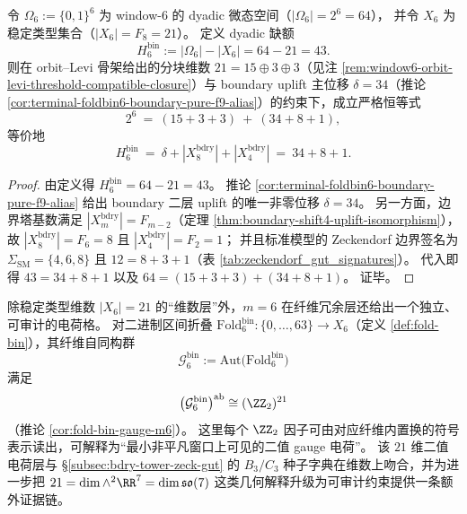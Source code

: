 \begin{proposition}\label{prop:window6-dyadic-budget-three-stage}
令 \(\Omega_6:=\{0,1\}^6\) 为 window-\(6\) 的 dyadic 微态空间（\(|\Omega_6|=2^6=64\)），
并令 \(X_6\) 为稳定类型集合（\(|X_6|=F_8=21\)）。
定义 dyadic 缺额
\[
H^{\mathrm{bin}}_6:=|\Omega_6|-|X_6|=64-21=43.
\]
则在 orbit--Levi 骨架给出的分块维数 \(21=15\oplus 3\oplus 3\)（见注 \ref{rem:window6-orbit-levi-threshold-compatible-closure}）与 boundary uplift 主位移 \(\delta=34\)（推论 \ref{cor:terminal-foldbin6-boundary-pure-f9-alias}）的约束下，成立严格恒等式
\[
2^6\ =\ (15+3+3)\ +\ (34+8+1),
\]
等价地
\[
H^{\mathrm{bin}}_6\ =\ \delta+|X^{\mathrm{bdry}}_8|+|X^{\mathrm{bdry}}_4|
\ =\ 34+8+1.
\]
\end{proposition}

\begin{proof}
由定义得 \(H^{\mathrm{bin}}_6=64-21=43\)。
推论 \ref{cor:terminal-foldbin6-boundary-pure-f9-alias} 给出 boundary 二层 uplift 的唯一非零位移 \(\delta=34\)。
另一方面，边界塔基数满足 \(|X_m^{\mathrm{bdry}}|=F_{m-2}\)（定理 \ref{thm:boundary-shift4-uplift-isomorphism}），故
\(|X_8^{\mathrm{bdry}}|=F_6=8\) 且 \(|X_4^{\mathrm{bdry}}|=F_2=1\)；
并且标准模型的 Zeckendorf 边界签名为 \(\Sigma_{\mathrm{SM}}=\{4,6,8\}\) 且 \(12=8+3+1\)（表 \ref{tab:zeckendorf_gut_signatures}）。
代入即得
\(
43=34+8+1
\)
以及
\(
64=(15+3+3)+(34+8+1)
\)。
证毕。
\end{proof}

\begin{remark}[fold-gauge 的 \texorpdfstring{$(\ZZ_2)^{21}$}{(Z2)^21} 二值电荷层（\texorpdfstring{$m=6$}{m=6}，dyadic 读出）]\label{rem:fold-gauge-z2-21}
除稳定类型维数 \(|X_6|=21\) 的“维数层”外，\(m=6\) 在纤维冗余层还给出一个独立、可审计的电荷格。
对二进制区间折叠 \(\mathrm{Fold}^{\mathrm{bin}}_6:\{0,\dots,63\}\to X_6\)（定义 \ref{def:fold-bin}），其纤维自同构群
\[
\mathcal{G}^{\mathrm{bin}}_6:=\mathrm{Aut}\!\bigl(\mathrm{Fold}^{\mathrm{bin}}_6\bigr)
\]
满足
\[
\bigl(\mathcal{G}^{\mathrm{bin}}_6\bigr)^{\mathrm{ab}}\cong (\ZZ_2)^{21}
\]
（推论 \ref{cor:fold-bin-gauge-m6}）。
这里每个 \(\ZZ_2\) 因子可由对应纤维内置换的符号表示读出，可解释为“最小非平凡窗口上可见的二值 gauge 电荷”。
该 \(21\) 维二值电荷层与 \S\ref{subsec:bdry-tower-zeck-gut} 的 \(B_3/C_3\) 种子字典在维数上吻合，并为进一步把
\(
21=\dim\wedge^2\RR^7=\dim\mathfrak{so}(7)
\)
这类几何解释升级为可审计约束提供一条额外证据链。
\end{remark}

